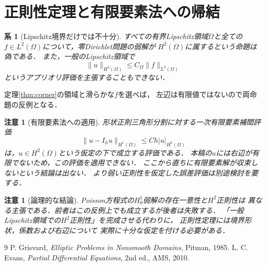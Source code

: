 \documentclass[a5paper,10pt,onecolumn]{jsarticle}
\makeatletter
\theoremstyle{mathnotetheorem}
\newtheorem{corollary}[theorem]{系}
\newtheorem{remark}[theorem]{注意}
\renewcommand{\proofname}{証明}
\renewenvironment{proof}[1][\proofname]{%
  \par\pushQED{\qed}\normalfont\topsep4\p@\@plus2\p@\relax
  \trivlist\item[\hskip\labelsep\bfseries #1]\ignorespaces
}{\popQED\endtrivlist\@endpefalse}
\makeatother
\begin{document}
\section{正則性定理と有限要素法への帰結}
\begin{corollary}[Lipschitz境界だけでは不十分]
すべての有界Lipschitz領域$\Omega$と全ての
$f\in L^2(\Omega)$について，零Dirichlet問題の弱解が
$H^2(\Omega)$に属するという命題は偽である．
また，一般のLipschitz領域で
\[
 \|u\|_{H^2(\Omega)}\le C_\Omega\|f\|_{L^2(\Omega)}
\]
というアプリオリ評価を主張することもできない．
\end{corollary}
\begin{proof}
定理\ref{thm:corner}の領域と滑らかな$f$を選べば，
左辺は有限値ではないので両命題の反例となる．
\end{proof}

\begin{remark}[有限要素法への適用]
形状正則三角形分割に対する一次有限要素補間評価
\[
 \|u-I_hu\|_{H^1(\Omega)}\le Ch|u|_{H^2(\Omega)}
\]
は，$u\in H^2(\Omega)$という仮定の下で成立する評価である．
本稿の$u$には右辺が有限でないため，この評価を適用できない．
ここから直ちに有限要素解が収束しないという結論は出ない．
より弱い正則性を仮定した誤差評価は別途検討を要する．
\end{remark}

\begin{remark}[論理的な結論]
Poisson方程式の$H_0^1$弱解の存在一意性と$H^2$正則性は
異なる主張である．前者はこの反例上でも成立するが後者は失敗する．
「一般Lipschitz領域での$H^2$正則性」を完成させる代わりに，
正則性定理には境界形状，係数および右辺について
実際に十分な仮定を付ける必要がある．
\end{remark}

\begin{thebibliography}{9}
 P. Grisvard,
 \emph{Elliptic Problems in Nonsmooth Domains}, Pitman, 1985.
 L. C. Evans,
 \emph{Partial Differential Equations}, 2nd ed., AMS, 2010.
\end{thebibliography}
\end{document}
